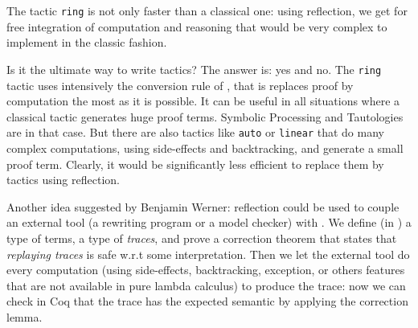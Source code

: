 The tactic \texttt{ring} is not only faster than a classical one:
using reflection, we get for free integration of computation and
reasoning that would be very complex to implement in the classic fashion.

Is it the ultimate way to write tactics?  The answer is: yes and
no. The \texttt{ring} tactic uses intensively the conversion rule of
\CIC, that is replaces proof by computation the most as it is
possible. It can be useful in all situations where a classical tactic
generates huge proof terms. Symbolic Processing and Tautologies are in
that case. But there are also tactics like \texttt{auto} or
\texttt{linear} that do many complex computations, using side-effects
and backtracking, and generate a small proof term. Clearly, it would
be significantly less efficient to replace them by tactics using
reflection.

Another idea suggested by Benjamin Werner: reflection could be used to
couple an external tool (a rewriting program or a model checker) with
\Coq. We define (in \Coq) a type of terms, a type of \emph{traces},
and prove a correction theorem that states that \emph{replaying
traces} is safe w.r.t some interpretation. Then we let the external
tool do every computation (using side-effects, backtracking,
exception, or others features that are not available in pure lambda
calculus) to produce the trace: now we can check in Coq{} that the
trace has the expected semantic by applying the correction lemma.
 
